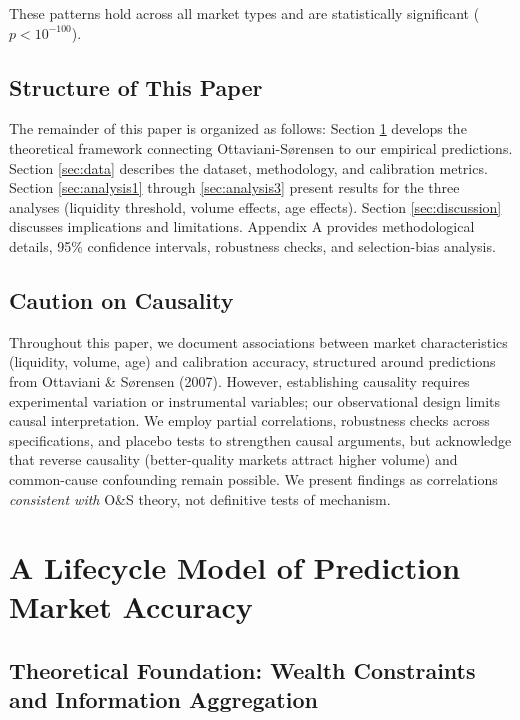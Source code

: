\documentclass[a4paper,11pt]{article}
\theoremstyle{plain}
\theoremstyle{definition}
\theoremstyle{remark}
\begin{document}
These patterns hold across all market types and are statistically significant ($p < 10^{-100}$).

\subsection{Structure of This Paper}
\label{subsec:structure}

The remainder of this paper is organized as follows: Section \ref{sec:theory} develops the theoretical framework connecting Ottaviani-Sørensen to our empirical predictions. Section \ref{sec:data} describes the dataset, methodology, and calibration metrics. Section \ref{sec:analysis1} through \ref{sec:analysis3} present results for the three analyses (liquidity threshold, volume effects, age effects). Section \ref{sec:discussion} discusses implications and limitations. Appendix A provides methodological details, 95\% confidence intervals, robustness checks, and selection-bias analysis.

\subsection{Caution on Causality}
\label{subsec:causality}

Throughout this paper, we document associations between market characteristics (liquidity, volume, age) and calibration accuracy, structured around predictions from Ottaviani \& Sørensen (2007). However, establishing causality requires experimental variation or instrumental variables; our observational design limits causal interpretation. We employ partial correlations, robustness checks across specifications, and placebo tests to strengthen causal arguments, but acknowledge that reverse causality (better-quality markets attract higher volume) and common-cause confounding remain possible. We present findings as correlations \textit{consistent with} O\&S theory, not definitive tests of mechanism.


\section{A Lifecycle Model of Prediction Market Accuracy}
\label{sec:theory}

\subsection{Theoretical Foundation: Wealth Constraints and Information Aggregation}
\label{subsec:foundation}
\end{document}
